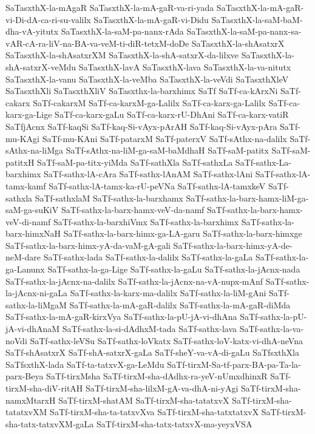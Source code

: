 {SaTasxthX-la-mAgaR
SaTasxthX-la-mA-gaR-va-ri-yada
SaTasxthX-la-mA-gaR-vi-Di-dA-ca-ri-su-valilx
SaTasxthX-la-mA-gaR-vi-Didu
SaTasxthX-la-saM-baM-dha-vA-yitutx
SaTasxthX-la-saM-pa-nanx-rAda
SaTasxthX-la-saM-pa-nanx-sa-vAR-cA-ra-liV-na-BA-va-veM-ti-diR-tetxM-doDe
SaTasxthX-la-shAsatxrX
SaTasxthX-la-shAsatxrXM
SaTasxthX-la-shA-satxrX-da-lilxve
SaTasxthX-la-shA-satxrX-veMdu
SaTasxthX-lavA
SaTasxthX-lava
SaTasxthX-la-va-nitutx
SaTasxthX-la-vanu
SaTasxthX-la-veMba
SaTasxthX-la-veVdi
SaTasxthXleV
SaTasxthXli
SaTasxthXliV
SaTasxthx-la-barxhimx
SaTf
SaTf-ca-kArxNi
SaTf-cakarx
SaTf-cakarxM
SaTf-ca-karxM-ga-Lalilx
SaTf-ca-karx-ga-Lalilx
SaTf-ca-karx-ga-Lige
SaTf-ca-karx-gaLu
SaTf-ca-karx-rU-DhAni
SaTf-ca-karx-vatiR
SaTfjAcnx
SaTf-kaqSi
SaTf-kaq-Si-vAyx-pArAH
SaTf-kaq-Si-vAyx-pAra
SaTf-mu-KAgi
SaTf-mu-KAni
SaTf-patarxM
SaTf-paterxV
SaTf-sAthx-na-dalilx
SaTf-sAthx-na-liMga
SaTf-sAthx-na-liM-ga-saM-baMdhaH
SaTf-saM-patitx
SaTf-saM-patitxH
SaTf-saM-pa-titx-yiMda
SaTf-sathXla
SaTf-sathxLa
SaTf-sathx-La-barxhimx
SaTf-sathx-lA-cAra
SaTf-sathx-lAnAM
SaTf-sathx-lAni
SaTf-sathx-lA-tamx-kamf
SaTf-sathx-lA-tamx-ka-rU-peVNa
SaTf-sathx-lA-tamxkeV
SaTf-sathxla
SaTf-sathxlaM
SaTf-sathx-la-barxhamx
SaTf-sathx-la-barx-hamx-liM-ga-saM-ga-suKiV
SaTf-sathx-la-barx-hamx-veV-da-namf
SaTf-sathx-la-barx-hamx-veV-di-namf
SaTf-sathx-la-barxhiVmx
SaTf-sathx-la-barxhimx
SaTf-sathx-la-barx-himxNaH
SaTf-sathx-la-barx-himx-ga-LA-garu
SaTf-sathx-la-barx-himxge
SaTf-sathx-la-barx-himx-yA-da-vaM-gA-gali
SaTf-sathx-la-barx-himx-yA-de-neM-dare
SaTf-sathx-lada
SaTf-sathx-la-dalilx
SaTf-sathx-la-gaLa
SaTf-sathx-la-ga-Lanunx
SaTf-sathx-la-ga-Lige
SaTf-sathx-la-gaLu
SaTf-sathx-la-jAcnx-nada
SaTf-sathx-la-jAcnx-na-dalilx
SaTf-sathx-la-jAcnx-na-vA-nupx-mAnf
SaTf-sathx-la-jAcnx-ni-gaLa
SaTf-sathx-la-karx-ma-dalilx
SaTf-sathx-la-liM-gAni
SaTf-sathx-la-liMgaM
SaTf-sathx-la-mA-gaR-dalilx
SaTf-sathx-la-mA-gaR-diMda
SaTf-sathx-la-mA-gaR-kirxVya
SaTf-sathx-la-pU-jA-vi-dhAna
SaTf-sathx-la-pU-jA-vi-dhAnaM
SaTf-sathx-la-si-dAdhxM-tada
SaTf-sathx-lava
SaTf-sathx-la-va-noVdi
SaTf-sathx-leVSu
SaTf-sathx-loVkatx
SaTf-sathx-loV-katx-vi-dhA-neVna
SaTf-shAsatxrX
SaTf-shA-satxrX-gaLa
SaTf-sheY-va-vA-di-gaLu
SaTfsxthXla
SaTfsxthX-lada
SaTf-ta-tatxvX-ga-LeMdu
SaTf-tirxM-Sa-tf-parx-BA-pa-Ta-la-parx-Beya
SaTf-tirxMsha
SaTf-tirxM-sha-dAdhx-ra-yeV-nUmxdhinxR
SaTf-tirxM-sha-diV-ritAH
SaTf-tirxM-sha-lilxM-gA-va-dhA-ni-yAgi
SaTf-tirxM-sha-namxMtarxH
SaTf-tirxM-shatAM
SaTf-tirxM-sha-tatatxvX
SaTf-tirxM-sha-tatatxvXM
SaTf-tirxM-sha-ta-tatxvXva
SaTf-tirxM-sha-tatxtatxvX
SaTf-tirxM-sha-tatx-tatxvXM-gaLa
SaTf-tirxM-sha-tatx-tatxvX-ma-yeyxVSA
}
